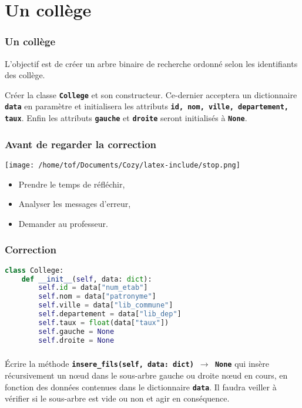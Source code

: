 \documentclass[svgnames,11pt]{beamer}
\begin{document}
\section{Un collège}
\begin{frame}
    \frametitle{Un collège}
L'objectif est de créer un arbre binaire de recherche ordonné selon les identifiants des collège.
    \begin{activite}
 Créer la classe \textbf{\texttt{College}} et son constructeur. Ce-dernier acceptera un dictionnaire \textbf{\texttt{data}} en paramètre et initialisera les attributs \textbf{\texttt{id, nom, ville, departement, taux}}. Enfin les attributs \textbf{\texttt{gauche}} et \textbf{\texttt{droite}} seront initialisés à \textbf{\texttt{None}}.
    \end{activite}

\end{frame}
\begin{frame}
    \frametitle{Avant de regarder la correction}
\begin{center}
    \centering
    \texttt{[image: /home/tof/Documents/Cozy/latex-include/stop.png]}
    \end{center}
{\Large
    \begin{itemize}
        \item Prendre le temps de réfléchir,
        \item Analyser les messages d'erreur,
        \item Demander au professeur.
    \end{itemize}
}
\end{frame}
\begin{frame}[fragile]
    \frametitle{Correction}

\begin{center}
\begin{lstlisting}[language=Python , basicstyle=\ttfamily\small, xleftmargin=0em, xrightmargin=0em]
class College:
    def __init__(self, data: dict):
        self.id = data["num_etab"]
        self.nom = data["patronyme"]
        self.ville = data["lib_commune"]
        self.departement = data["lib_dep"]
        self.taux = float(data["taux"])
        self.gauche = None
        self.droite = None
\end{lstlisting}
\end{center}   

\end{frame}
\begin{frame}
    \frametitle{}

    \begin{activite}
    Écrire la méthode \textbf{\texttt{insere\_fils(self, data: dict) $\rightarrow$ None}} qui insère récursivement un nœud dans le sous-arbre gauche ou droite nœud en cours, en fonction des données contenues dans le dictionnaire \textbf{\texttt{data}}. Il faudra veiller à vérifier si le sous-arbre est vide ou non et agir en conséquence.
    \end{activite}

\end{frame}
\end{document}
